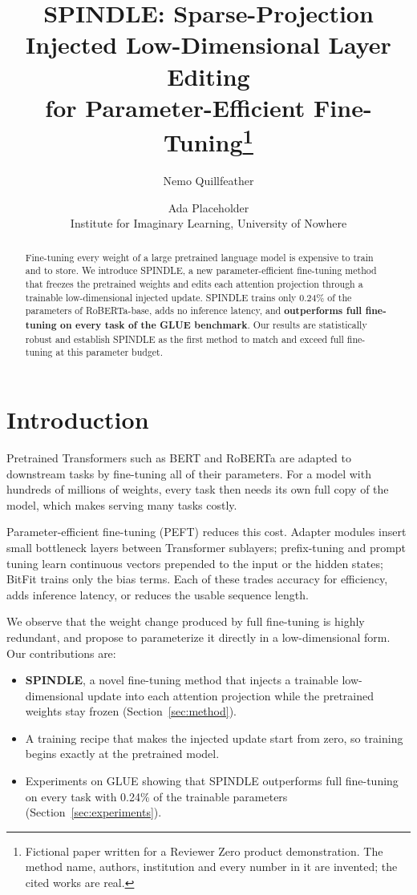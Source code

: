 \documentclass[10pt]{article}
\title{SPINDLE: Sparse-Projection Injected Low-Dimensional Layer Editing\\for Parameter-Efficient Fine-Tuning\thanks{Fictional paper written for a Reviewer Zero product demonstration. The method name, authors, institution and every number in it are invented; the cited works are real.}}
\author{Nemo Quillfeather \and Ada Placeholder\\
Institute for Imaginary Learning, University of Nowhere}
\date{}
\begin{document}
\maketitle
\thispagestyle{fancy}

\begin{abstract}
Fine-tuning every weight of a large pretrained language model is expensive to train and to store. We introduce SPINDLE, a new parameter-efficient fine-tuning method that freezes the pretrained weights and edits each attention projection through a trainable low-dimensional injected update. SPINDLE trains only 0.24\% of the parameters of RoBERTa-base, adds no inference latency, and \textbf{outperforms full fine-tuning on every task of the GLUE benchmark}. Our results are statistically robust and establish SPINDLE as the first method to match and exceed full fine-tuning at this parameter budget.
\end{abstract}

\section{Introduction}
Pretrained Transformers \citep{vaswani} such as BERT \citep{bert} and RoBERTa \citep{roberta} are adapted to downstream tasks by fine-tuning all of their parameters. For a model with hundreds of millions of weights, every task then needs its own full copy of the model, which makes serving many tasks costly.

Parameter-efficient fine-tuning (PEFT) reduces this cost. Adapter modules \citep{houlsby} insert small bottleneck layers between Transformer sublayers; prefix-tuning \citep{prefix} and prompt tuning \citep{prompttuning} learn continuous vectors prepended to the input or the hidden states; BitFit \citep{bitfit} trains only the bias terms. Each of these trades accuracy for efficiency, adds inference latency, or reduces the usable sequence length.

We observe that the weight change produced by full fine-tuning is highly redundant, and propose to parameterize it directly in a low-dimensional form. Our contributions are:
\begin{itemize}
\item \textbf{SPINDLE}, a novel fine-tuning method that injects a trainable low-dimensional update into each attention projection while the pretrained weights stay frozen (Section~\ref{sec:method}).
\item A training recipe that makes the injected update start from zero, so training begins exactly at the pretrained model.
\item Experiments on GLUE \citep{glue} showing that SPINDLE outperforms full fine-tuning on every task with 0.24\% of the trainable parameters (Section~\ref{sec:experiments}).
\end{itemize}
\end{document}
